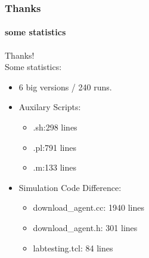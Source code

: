 \documentclass[14pt]{beamer}
\begin{document}
\begin{frame}
\frametitle{Thanks}
\framesubtitle{some statistics}
Thanks! \\
Some statistics:
\begin{itemize}
	\item 6 big versions / 240 runs. 
	\item Auxilary Scripts:
	\begin{itemize}
	\item .sh:298 lines
	\item .pl:791  lines
	\item .m:133 lines
	\end{itemize}
	\item Simulation Code Difference:	
	\begin{itemize}
		\item download\_agent.cc: 1940 lines
		\item download\_agent.h: 301 lines
		\item labtesting.tcl: 84 lines
	\end{itemize}
\end{itemize}
\end{frame}
\end{document}
